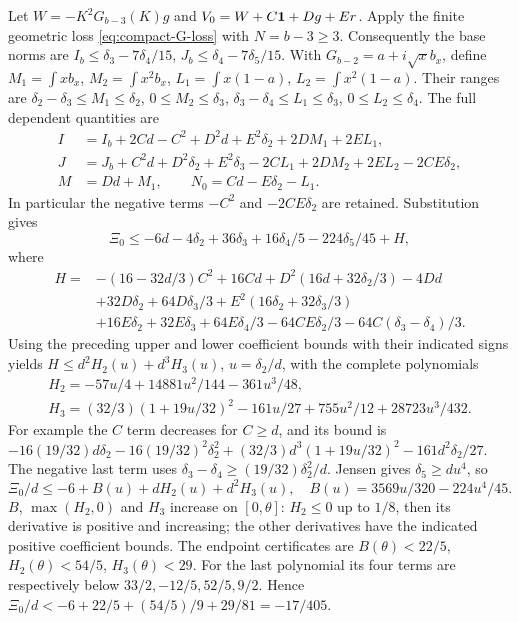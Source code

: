 Let $W=-K^2G_{b-3}(K)g$ and $V_0=W+C\mathbf1+Dg+Er$.
Apply the finite geometric loss \eqref{eq:compact-G-loss} with $N=b-3\ge3$.
Consequently the base norms are
$I_b\le \delta_{3}-7\delta_{4}/15$, $J_b\le \delta_{4}-7\delta_{5}/15$.
With $G_{b-2}=a+i\sqrt x b_x$, define
$M_1=\int xb_x$, $M_2=\int x^2b_x$,
$L_1=\int x(1-a)$, $L_2=\int x^2(1-a)$.
Their ranges are
$\delta_{2}-\delta_{3}\le M_1\le \delta_{2}$, $0\le M_2\le \delta_{3}$,
$\delta_{3}-\delta_{4}\le L_1\le \delta_{3}$, $0\le L_2\le \delta_{4}$.
The full dependent quantities are
\begin{align*}
 I&=I_b+2Cd-C^2+D^2d+E^2\delta_{2}+2DM_1+2EL_1,\\
 J&=J_b+C^2d+D^2\delta_{2}+E^2\delta_{3}-2CL_1+2DM_2+2EL_2-2CE\delta_{2},\\
 M&=Dd+M_1,\qquad N_0=Cd-E\delta_{2}-L_1.
\end{align*}
In particular the negative terms $-C^2$ and $-2CE\delta_{2}$ are retained.
Substitution gives
\[
 \Xi_0\le-6d-4\delta_{2}+36\delta_{3}+16\delta_{4}/5-224\delta_{5}/45+H,
\]
where
\begin{align*}
 H={}&-(16-32d/3)C^2+16Cd+D^2(16d+32\delta_{2}/3)-4Dd\\
 &+32D\delta_{2}+64D\delta_{3}/3+E^2(16\delta_{2}+32\delta_{3}/3)\\
 &+16E\delta_{2}+32E\delta_{3}+64E\delta_{4}/3-64CE\delta_{2}/3-64C(\delta_{3}-\delta_{4})/3.
\end{align*}
Using the preceding upper and lower coefficient bounds with their
indicated signs yields $H\le d^2H_2(u)+d^3H_3(u)$, $u=\delta_{2}/d$,
with the complete polynomials
\begin{gather*}
 H_2=-57u/4+14881u^2/144-361u^3/48,\\
 H_3=(32/3)(1+19u/32)^2-161u/27+755u^2/12+28723u^3/432.
\end{gather*}
For example the $C$ term decreases for $C\ge d$, and its bound is
$-16(19/32)d\delta_{2}-16(19/32)^2\delta_{2}^2+
(32/3)d^3(1+19u/32)^2-161d^2\delta_{2}/27$.
The negative last term uses $\delta_{3}-\delta_{4}\ge(19/32)\delta_{2}^2/d$.
Jensen gives $\delta_{5}\ge du^4$, so
\[
 \Xi_0/d\le-6+B(u)+dH_2(u)+d^2H_3(u),\quad
 B(u)=3569u/320-224u^4/45.
\]
$B$, $\max(H_2,0)$ and $H_3$ increase on $[0,\theta]$:
$H_2\le0$ up to $1/8$, then its derivative is positive and increasing;
the other derivatives have the indicated positive coefficient bounds.
The endpoint certificates are
$B(\theta)<22/5$, $H_2(\theta)<54/5$, $H_3(\theta)<29$.
For the last polynomial its four terms are respectively below
$33/2,-12/5,52/5,9/2$.
Hence $\Xi_0/d<-6+22/5+(54/5)/9+29/81=-17/405$.

